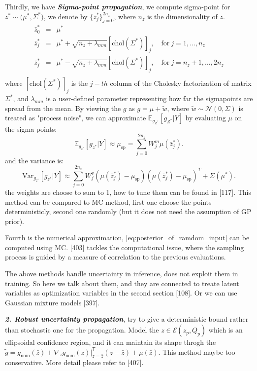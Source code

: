 \documentclass[10pt]{elegantbook}
\newcommand{\mydefination}[1]{\textbf{\textit{\textcolor{structurecolor}{#1}}}}
\begin{document}
Thirdly, we have \mydefination{Sigma-point propagation}, we compute sigma-point for $z^* \sim \mathcal (\mu^*, \Sigma^*)$,
we denote by $\{\bar{z}_{j}^{*}\}_{j=0}^{2n_{z}}$, where $n_z$ is the dimensionality of $z$.
\begin{equation}
    \begin{array}{lll}
        \bar{z}_{0}^{*} &=& \mu^{*} \\
        \bar{z}_{j}^{*} &=& \mu^{*}+\sqrt{n_{z}+\lambda_{m m}}[\mathrm{chol}(\Sigma^{*})]_{j}, \quad \text{for} ~j=1, \ldots, n_z \\
        \bar{z}_{j}^{*} &=& \mu^{*}-\sqrt{n_{z}+\lambda_{m m}}[\mathrm{chol}(\Sigma^{*})]_{j}, \quad \text{for} ~j=n_z + 1, \ldots, 2n_z \\
    \end{array}
\end{equation}
where $[\mathrm{chol}(\Sigma^{*})]_{j}$ is the $j-th$ column of the Cholesky factorization of matrix $\Sigma^*$, and $\lambda_{m m}$
is a user-defined parameter representing how far the sigmapoints are spread from the mean. By viewing the $g$ as $g = \mu + \tilde w$,
where $\tilde w \sim \mathcal N(0, \Sigma)$ is treated as "process noise", we can approximate $\mathbb E_{g_{Z^*}}[g_{Z^*} | Y]$ by
evaluating $\mu$ on the sigma-points:
\[
\mathbb{E}_{g_{z^{*}}}[g_{z^{*}} | Y]\approx\mu_{\mathrm{sp}}=\sum_{j=0}^{2n_{z}}W_{j}^{m}\mu({\bar{z}_{j}^{*}}).
\]
and the variance is:
\[
\text{Var}_{g_{z^{*}}}[g_{z^{*}} | Y] \approx\sum_{j=0}^{2n_{z}}W_{j}^{v}(\mu(\bar{z}_{j}^{*})-\mu_{\mathrm{sp}})(\mu(\bar{z}_{j}^{*})-\mu_{\mathrm{sp}})^{T}+\Sigma(\mu^{*}).
\]
the weights are choose to sum to 1, how to tune them can be found in [117]. This method can be compared to MC method, first 
one choose the points deterministicly, second one randomly (but it does not need the assumption of GP prior).

Fourth is the numerical approximation, \ref{eq:posterior_of_ramdom_input} can be computed using MC. [403] tackles the computational
issue, where the sampling process is guided by a measure of correlation to the previous evaluations.

The above methods handle uncertainty in inference, does not exploit them in training. So here we talk about them, and they 
are connected to treate latent variables as optimization variables in the second section [108]. Or we can use Gaussian mixture 
models [397].

\mydefination{2. Robust uncertainty propagation}, try to give a deterministic bound rather than stochastic one for the propagation.
Model the $z \in \mathcal E(z_p, Q_p)$ which is an ellipsoidal confidence region, and it can maintain its shape throgh the $\tilde{g} = 
g_{\mathrm{nom}}(\bar{z})+\nabla_{z}g_{\mathrm{nom}}(z)|_{z=\bar{z}}^{\mathsf{T}}(z-\bar{z}) + \mu(\bar z)$. This method maybe too 
conservative. More detail please refer to [407].
\end{document}
